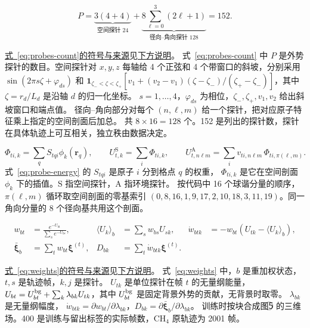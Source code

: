 \documentclass[UTF8,fontset=fandol,11pt]{ctexart}
\newcommand{\xiF}{\bm\xi}
\newcommand{\X}{\bar{\bm\xi}}
\newcommand{\fref}[2]{\par{\footnotesize \hyperref[#1]{式~\ref{#1}的符号与来源}见\hyperref[#2]{下方说明}。}}
\newcommand{\defat}[1]{\phantomsection\label{#1}}
\begin{document}
\begin{equation}
P=\underbrace{3(4+4)}_{\text{空间探针 }24}
  +\underbrace{8\sum_{\ell=0}^{3}(2\ell+1)}_{\text{径向--角向探针 }128}
=152 .
\label{eq:probes-count}
\end{equation}
\fref{eq:probes-count}{def:probes-count}
\defat{def:probes-count}
式~\ref{eq:probes-count} 中 \(P\) 是外势探针的数目。空间探针对 \(x,y,z\) 每轴给
4 个正弦和 4 个带窗口的斜坡，分别采用
\(\sin(2\pi s\zeta+\varphi_{ds})\) 和
\(\mathbf1_{\zeta_-<\zeta<\zeta_+}[v_1+(v_2-v_1)(\zeta-\zeta_-)/(\zeta_+-\zeta_-)]\)，其中
\(\zeta=r_d/L_d\) 是沿轴 \(d\) 的归一化坐标。
\(s=1,\ldots,4\)，\(\varphi_{ds}\) 为相位，\(\zeta_-,\zeta_+,v_1,v_2\) 给出斜坡窗口和端点值。
径向–角向部分对每个 \((n,\ell,m)\) 给一个探针，把对应原子特征乘上指定的空间剖面后加总。
共 \(8\times16=128\) 个。152 是列出的探针数，探针在具体轨迹上可互相关，独立秩由数据决定。

\begin{equation}
\Phi_{ti,k}=\sum_q S_{tqi}\phi_k(\mathbf r_q),\qquad
U^{\mathrm{S}}_{t,k}=\sum_i\Phi_{ti,k},\qquad
U^{\mathrm{A}}_{t,n\ell m}=\sum_i
v_{ti,n\ell m}\,\Phi_{ti,\pi(\ell,m)}.
\label{eq:probe-energy}
\end{equation}
\noindent\defat{def:probe-energy}
式~\ref{eq:probe-energy} 的 \(S_{tqi}\) 是原子 \(i\) 分到格点 \(q\) 的权重，
\(\Phi_{ti,k}\) 是它在空间剖面 \(\phi_k\) 下的插值。S 指空间探针，A 指环境探针。
按代码中 16 个球谐分量的顺序，\(\pi(\ell,m)\) 循环取空间剖面的零基索引
\((0,8,16,1,9,17,2,10,18,3,11,19)\)。同一角向分量的 8 个径向基共用这个剖面。

\begin{equation}
\begin{aligned}
w_{bt}&=\frac{e^{-U_{bt}}}{\sum_s e^{-U_{bs}}},&
\langle U_k\rangle_b&=\sum_s w_{bs} U_{sk},&
\dot w_{btk}&=-w_{bt}(U_{tk}-\langle U_k\rangle_b),\\
\X_b&=\sum_t w_{bt}\xiF^{(t)},&
D_{bk}&=\sum_t \dot w_{btk}\xiF^{(t)}.
\end{aligned}
\label{eq:weights}
\end{equation}
\fref{eq:weights}{def:weights}
\defat{def:weights}
式~\ref{eq:weights} 中，$b$ 是重加权状态，$t,s$ 是轨迹帧，$k,j$ 是探针。
$U_{tk}$ 是单位探针在帧 $t$ 的无量纲能量，
$U_{bt}=U^{\rm bg}_{bt}+\sum_k\lambda_{bk}U_{tk}$，其中 $U^{\rm bg}_{bt}$ 是固定背景外势的贡献，无背景时取零。
$\lambda_{bk}$ 是无量纲幅度，
$\dot w_{btk}=\partial w_{bt}/\partial\lambda_{bk}$，$D_{bk}=\partial\X_b/\partial\lambda_{bk}$。
训练时按块合成图\textcircled{\scriptsize 5} 的三维场。400 是训练与留出标签的实际帧数，CH$_4$ 原轨迹为 2001 帧。
\endgroup
\end{document}
